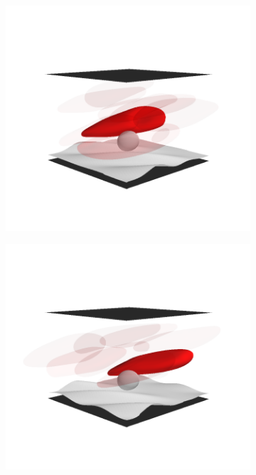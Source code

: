 \begin{figure}[th!]
    \vspace{11pt}

    \begin{subfigure}[t]{0.5\textwidth}
        \includegraphics[trim=50 75 50 125, clip, width=\textwidth]{figures/unicycle3.png}%
    \end{subfigure}%
    \begin{subfigure}[t]{0.5\textwidth}
        \includegraphics[trim=50 75 50 125, clip, width=\textwidth]{figures/unicycle4.png}%
    \end{subfigure}


\end{figure}
